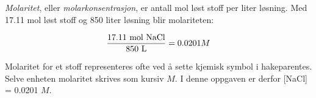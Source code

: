 \vskip 10pt

{\it Molaritet}, eller {\it molarkonsentrasjon}, er antall mol løst stoff per liter løsning. Med 17.11 mol løst stoff og 850 liter løsning blir molariteten:

$${{17.11 \hbox{ mol NaCl}} \over {850 \hbox{ L}}} = 0.0201 M$$

Molaritet for et stoff representeres ofte ved å sette kjemisk symbol i hakeparentes. Selve enheten molaritet skrives som kursiv $M$. I denne oppgaven er derfor [NaCl] = 0.0201 $M$.










